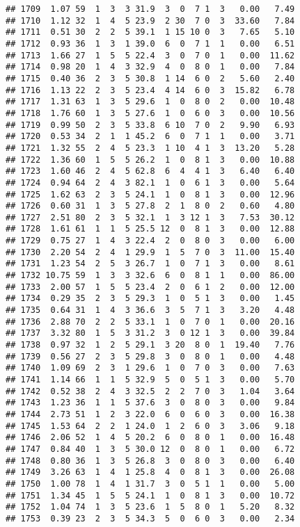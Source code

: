 \documentclass[
]{article}
\begin{document}
\begin{verbatim}
## 1709  1.07 59  1  3  3 31.9  3  0  7 1  3   0.00   7.49
## 1710  1.12 32  1  4  5 23.9  2 30  7 0  3  33.60   7.84
## 1711  0.51 30  2  2  5 39.1  1 15 10 0  3   7.65   5.10
## 1712  0.93 36  1  3  1 39.0  6  0  7 1  1   0.00   6.51
## 1713  1.66 27  1  5  5 22.4  3  0  7 0  1   0.00  11.62
## 1714  0.98 20  1  4  3 32.9  4  0  8 0  1   0.00   7.84
## 1715  0.40 36  2  3  5 30.8  1 14  6 0  2   5.60   2.40
## 1716  1.13 22  2  3  5 23.4  4 14  6 0  3  15.82   6.78
## 1717  1.31 63  1  3  5 29.6  1  0  8 0  2   0.00  10.48
## 1718  1.76 60  1  3  5 27.6  1  0  6 0  3   0.00  10.56
## 1719  0.99 50  2  3  5 33.8  6 10  7 0  2   9.90   6.93
## 1720  0.53 34  2  1  1 45.2  6  0  7 1  1   0.00   3.71
## 1721  1.32 55  2  4  5 23.3  1 10  4 1  3  13.20   5.28
## 1722  1.36 60  1  5  5 26.2  1  0  8 1  3   0.00  10.88
## 1723  1.60 46  2  4  5 62.8  6  4  4 1  3   6.40   6.40
## 1724  0.94 64  2  4  3 82.1  1  0  6 1  3   0.00   5.64
## 1725  1.62 63  2  3  5 24.1  1  0  8 1  3   0.00  12.96
## 1726  0.60 31  1  3  5 27.8  2  1  8 0  2   0.60   4.80
## 1727  2.51 80  2  3  5 32.1  1  3 12 1  3   7.53  30.12
## 1728  1.61 61  1  1  5 25.5 12  0  8 1  3   0.00  12.88
## 1729  0.75 27  1  4  3 22.4  2  0  8 0  3   0.00   6.00
## 1730  2.20 54  2  4  1 29.9  1  5  7 0  3  11.00  15.40
## 1731  1.23 54  2  5  3 26.7  1  0  7 1  3   0.00   8.61
## 1732 10.75 59  1  3  3 32.6  6  0  8 1  1   0.00  86.00
## 1733  2.00 57  1  5  5 23.4  2  0  6 1  2   0.00  12.00
## 1734  0.29 35  2  3  5 29.3  1  0  5 1  3   0.00   1.45
## 1735  0.64 31  1  4  3 36.6  3  5  7 1  3   3.20   4.48
## 1736  2.88 70  2  2  5 33.1  1  0  7 0  1   0.00  20.16
## 1737  3.32 80  1  5  3 31.2  3  0 12 1  3   0.00  39.84
## 1738  0.97 32  1  2  5 29.1  3 20  8 0  1  19.40   7.76
## 1739  0.56 27  2  3  5 29.8  3  0  8 0  1   0.00   4.48
## 1740  1.09 69  2  3  1 29.6  1  0  7 0  3   0.00   7.63
## 1741  1.14 66  1  1  5 32.9  5  0  5 1  3   0.00   5.70
## 1742  0.52 38  2  4  3 32.5  2  2  7 0  3   1.04   3.64
## 1743  1.23 36  1  1  5 37.6  3  0  8 0  3   0.00   9.84
## 1744  2.73 51  1  2  3 22.0  6  0  6 0  3   0.00  16.38
## 1745  1.53 64  2  2  1 24.0  1  2  6 0  3   3.06   9.18
## 1746  2.06 52  1  4  5 20.2  6  0  8 0  1   0.00  16.48
## 1747  0.84 40  1  3  5 30.0 12  0  8 0  1   0.00   6.72
## 1748  0.80 36  1  3  5 26.8  3  0  8 0  3   0.00   6.40
## 1749  3.26 63  1  4  1 25.8  4  0  8 1  3   0.00  26.08
## 1750  1.00 78  1  4  1 31.7  3  0  5 1  1   0.00   5.00
## 1751  1.34 45  1  5  5 24.1  1  0  8 1  3   0.00  10.72
## 1752  1.04 74  1  3  5 23.6  1  5  8 0  1   5.20   8.32
## 1753  0.39 23  2  3  5 34.3  5  0  6 0  3   0.00   2.34

\end{verbatim}
\end{document}
